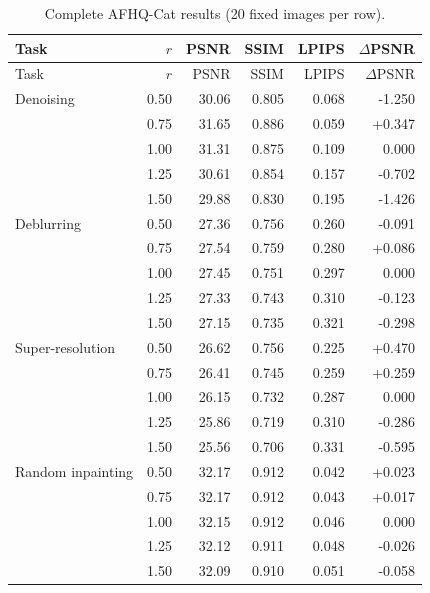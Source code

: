 \documentclass[11pt,a4paper]{article}
\begin{document}

\begin{longtable}{lrrrrr}

\caption{
Complete AFHQ-Cat results (20 fixed images per row).
}
\label{tab:allafhq}
\\

\toprule
Task & $r$ & PSNR & SSIM & LPIPS & $\Delta$PSNR\\
\midrule
\endfirsthead

\toprule
Task & $r$ & PSNR & SSIM & LPIPS & $\Delta$PSNR\\
\midrule
\endhead

Denoising & 0.50 & 30.06 & 0.805 & 0.068 & -1.250\\
& 0.75 & 31.65 & 0.886 & 0.059 & +0.347\\
& 1.00 & 31.31 & 0.875 & 0.109 & 0.000\\
& 1.25 & 30.61 & 0.854 & 0.157 & -0.702\\
& 1.50 & 29.88 & 0.830 & 0.195 & -1.426\\

\midrule

Deblurring & 0.50 & 27.36 & 0.756 & 0.260 & -0.091\\
& 0.75 & 27.54 & 0.759 & 0.280 & +0.086\\
& 1.00 & 27.45 & 0.751 & 0.297 & 0.000\\
& 1.25 & 27.33 & 0.743 & 0.310 & -0.123\\
& 1.50 & 27.15 & 0.735 & 0.321 & -0.298\\

\midrule

Super-resolution & 0.50 & 26.62 & 0.756 & 0.225 & +0.470\\
& 0.75 & 26.41 & 0.745 & 0.259 & +0.259\\
& 1.00 & 26.15 & 0.732 & 0.287 & 0.000\\
& 1.25 & 25.86 & 0.719 & 0.310 & -0.286\\
& 1.50 & 25.56 & 0.706 & 0.331 & -0.595\\

\midrule

Random inpainting & 0.50 & 32.17 & 0.912 & 0.042 & +0.023\\
& 0.75 & 32.17 & 0.912 & 0.043 & +0.017\\
& 1.00 & 32.15 & 0.912 & 0.046 & 0.000\\
& 1.25 & 32.12 & 0.911 & 0.048 & -0.026\\
& 1.50 & 32.09 & 0.910 & 0.051 & -0.058\\


\end{longtable}
\end{document}
